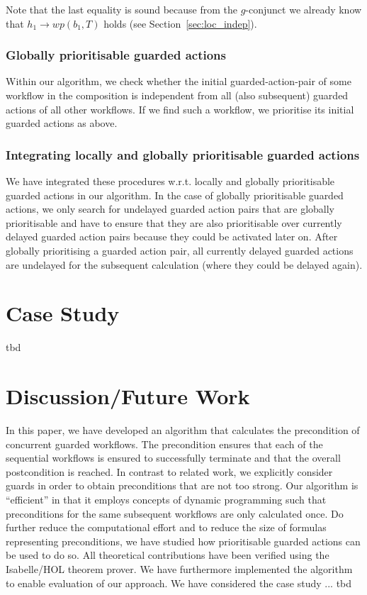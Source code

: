 \documentclass[11pt]{article}
\newcommand{\TODO}[1]{{\color{red} #1}}
\begin{document}
Note that the last equality is sound because from the $g$-conjunct we already know that $h_1 \longrightarrow wp(b_1,T)$ holds (see Section~\ref{sec:loc_indep}).  

\subsubsection{Globally prioritisable guarded actions}

Within our algorithm, we check whether the initial guarded-action-pair of some workflow in the composition is independent from all (also subsequent) guarded actions of all other workflows. If we find such a workflow, we prioritise its initial guarded actions as above.

\subsubsection{Integrating locally and globally prioritisable guarded actions}

We have integrated these procedures w.r.t. locally and globally prioritisable guarded actions in our algorithm. In the case of globally prioritisable guarded actions, we only search for undelayed guarded action pairs that are globally prioritisable and have to ensure that they are also prioritisable over currently delayed guarded action pairs because they could be activated later on. After globally prioritising a guarded action pair, all currently delayed guarded actions are undelayed for the subsequent calculation (where they could be delayed again).

\section{Case Study}

\TODO{tbd}
  
\section{Discussion/Future Work}

In this paper, we have developed an algorithm that calculates the precondition of concurrent guarded workflows. The precondition ensures that each of the sequential workflows is ensured to successfully terminate and that the overall postcondition is reached. In contrast to related work, we explicitly consider guards in order to obtain preconditions that are not too strong. Our algorithm is ``efficient'' in that it employs concepts of dynamic programming such that preconditions for the same subsequent workflows are only calculated once. Do further reduce the computational effort and to reduce the size of formulas representing preconditions, we have studied how prioritisable guarded actions can be used to do so. All theoretical contributions have been verified using the Isabelle/HOL theorem prover. We have furthermore implemented the algorithm to enable evaluation of our approach. We have considered the case study ... \TODO{tbd}
\end{document}
